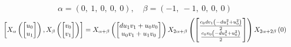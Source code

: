\documentclass[11pt]{article}
\theoremstyle{definition}
\begin{document}
\[
\alpha = \left( 0, \  1, \  0, \  0, \  0\right), \quad \beta = \left( -1, \  -1, \  0, \  0, \  0\right)
\]
\[
\scaletoalign{\textwidth}{\left[ X_{\alpha}\left(\left[\begin{matrix}u_{0}\\u_{1}\end{matrix}\right]\right), X_{\beta}\left(\left[\begin{matrix}v_{0}\\v_{1}\end{matrix}\right]\right) \right] = X_{\alpha + \beta}\left(\left[\begin{matrix}d u_{1} v_{1} + u_{0} v_{0}\\u_{0} v_{1} + u_{1} v_{0}\end{matrix}\right]\right) X_{2\alpha + \beta}\left(\left[\begin{matrix}\frac{c_{0} d v_{1} \left(- d u_{1}^{2} + u_{0}^{2}\right)}{2}\\\frac{c_{0} v_{0} \left(- d u_{1}^{2} + u_{0}^{2}\right)}{2}\end{matrix}\right]\right) X_{2\alpha + 2\beta}\left(0\right)}
\]
\end{document}
